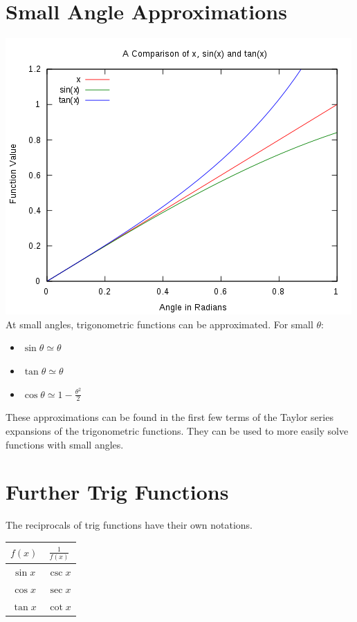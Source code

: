 \documentclass[a4paper,12pt]{article}
\begin{document}
\section*{Small Angle Approximations}
\includegraphics[scale=0.5]{Graph1} \\
At small angles, trigonometric functions can be approximated. For small $\theta$:
\begin{itemize}
	\item $\sin \theta \simeq \theta$
	\item $\tan \theta \simeq \theta$
	\item $\cos \theta \simeq 1 - \frac{\theta^2}{2}$
\end{itemize}
These approximations can be found in the first few terms of the Taylor series expansions of the trigonometric functions. They can be used to more easily solve functions with small angles. 
\section*{Further Trig Functions}
The reciprocals of trig functions have their own notations. \\
\begin{tabular}{ c c }
\hline
	 $f(x)$ & $\frac{1}{f(x)}$  \\ 
\hline
	$\sin x$ & $\csc x$ \\
	$\cos x$ & $\sec x$ \\
	$\tan x$ & $\cot x$ \\
\hline
\end{tabular}
\end{document}
